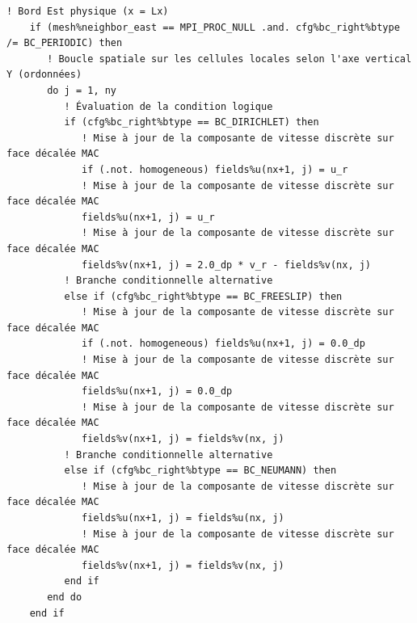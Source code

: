 \documentclass[10pt,a4paper,oneside]{book}
\begin{document}
\begin{lstlisting}[language={[95]Fortran}]
    ! Bord Est physique (x = Lx)
    if (mesh%neighbor_east == MPI_PROC_NULL .and. cfg%bc_right%btype /= BC_PERIODIC) then
       ! Boucle spatiale sur les cellules locales selon l'axe vertical Y (ordonnées)
       do j = 1, ny
          ! Évaluation de la condition logique
          if (cfg%bc_right%btype == BC_DIRICHLET) then
             ! Mise à jour de la composante de vitesse discrète sur face décalée MAC
             if (.not. homogeneous) fields%u(nx+1, j) = u_r
             ! Mise à jour de la composante de vitesse discrète sur face décalée MAC
             fields%u(nx+1, j) = u_r
             ! Mise à jour de la composante de vitesse discrète sur face décalée MAC
             fields%v(nx+1, j) = 2.0_dp * v_r - fields%v(nx, j)
          ! Branche conditionnelle alternative
          else if (cfg%bc_right%btype == BC_FREESLIP) then
             ! Mise à jour de la composante de vitesse discrète sur face décalée MAC
             if (.not. homogeneous) fields%u(nx+1, j) = 0.0_dp
             ! Mise à jour de la composante de vitesse discrète sur face décalée MAC
             fields%u(nx+1, j) = 0.0_dp
             ! Mise à jour de la composante de vitesse discrète sur face décalée MAC
             fields%v(nx+1, j) = fields%v(nx, j)
          ! Branche conditionnelle alternative
          else if (cfg%bc_right%btype == BC_NEUMANN) then
             ! Mise à jour de la composante de vitesse discrète sur face décalée MAC
             fields%u(nx+1, j) = fields%u(nx, j)
             ! Mise à jour de la composante de vitesse discrète sur face décalée MAC
             fields%v(nx+1, j) = fields%v(nx, j)
          end if
       end do
    end if


\end{lstlisting}
\end{document}
